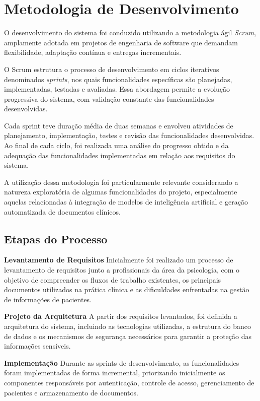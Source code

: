 \section{Metodologia de Desenvolvimento}

O desenvolvimento do sistema foi conduzido utilizando a metodologia ágil \textit{Scrum}, amplamente adotada em projetos de engenharia de software que demandam flexibilidade, adaptação contínua e entregas incrementais.

O Scrum estrutura o processo de desenvolvimento em ciclos iterativos denominados \textit{sprints}, nos quais funcionalidades específicas são planejadas, implementadas, testadas e avaliadas. Essa abordagem permite a evolução progressiva do sistema, com validação constante das funcionalidades desenvolvidas.

Cada sprint teve duração média de duas semanas e envolveu atividades de planejamento, implementação, testes e revisão das funcionalidades desenvolvidas. Ao final de cada ciclo, foi realizada uma análise do progresso obtido e da adequação das funcionalidades implementadas em relação aos requisitos do sistema.

A utilização dessa metodologia foi particularmente relevante considerando a natureza exploratória de algumas funcionalidades do projeto, especialmente aquelas relacionadas à integração de modelos de inteligência artificial e geração automatizada de documentos clínicos.

\subsection{Etapas do Processo}

\textbf{Levantamento de Requisitos} Inicialmente foi realizado um processo de levantamento de requisitos junto a profissionais da área da psicologia, com o objetivo de compreender os fluxos de trabalho existentes, os principais documentos utilizados na prática clínica e as dificuldades enfrentadas na gestão de informações de pacientes.

\textbf{Projeto da Arquitetura} A partir dos requisitos levantados, foi definida a arquitetura do sistema, incluindo as tecnologias utilizadas, a estrutura do banco de dados e os mecanismos de segurança necessários para garantir a proteção das informações sensíveis.

\textbf{Implementação} Durante as sprints de desenvolvimento, as funcionalidades foram implementadas de forma incremental, priorizando inicialmente os componentes responsáveis por autenticação, controle de acesso, gerenciamento de pacientes e armazenamento de documentos.

